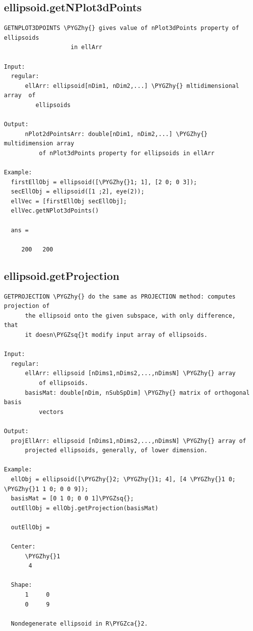 \documentclass[letterpaper,10pt,english]{sphinxmanual}
\def\PYGZca{\char`\^}
\def\PYGZhy{\char`\-}
\def\PYGZsq{\char`\'}
\begin{document}
\subsection{ellipsoid.getNPlot3dPoints}
\label{chap_functions:ellipsoid-getnplot3dpoints}
\begin{Verbatim}[commandchars=\\\{\}]
GETNPLOT3DPOINTS \PYGZhy{} gives value of nPlot3dPoints property of ellipsoids
                   in ellArr

Input:
  regular:
      ellArr: ellipsoid[nDim1, nDim2,...] \PYGZhy{} mltidimensional array  of
         ellipsoids

Output:
      nPlot2dPointsArr: double[nDim1, nDim2,...] \PYGZhy{} multidimension array
          of nPlot3dPoints property for ellipsoids in ellArr

Example:
  firstEllObj = ellipsoid([\PYGZhy{}1; 1], [2 0; 0 3]);
  secEllObj = ellipsoid([1 ;2], eye(2));
  ellVec = [firstEllObj secEllObj];
  ellVec.getNPlot3dPoints()

  ans =

     200   200
\end{Verbatim}


\subsection{ellipsoid.getProjection}
\label{chap_functions:ellipsoid-getprojection}
\begin{Verbatim}[commandchars=\\\{\}]
GETPROJECTION \PYGZhy{} do the same as PROJECTION method: computes projection of
      the ellipsoid onto the given subspace, with only difference, that
      it doesn\PYGZsq{}t modify input array of ellipsoids.

Input:
  regular:
      ellArr: ellipsoid [nDims1,nDims2,...,nDimsN] \PYGZhy{} array
          of ellipsoids.
      basisMat: double[nDim, nSubSpDim] \PYGZhy{} matrix of orthogonal basis
          vectors

Output:
  projEllArr: ellipsoid [nDims1,nDims2,...,nDimsN] \PYGZhy{} array of
      projected ellipsoids, generally, of lower dimension.

Example:
  ellObj = ellipsoid([\PYGZhy{}2; \PYGZhy{}1; 4], [4 \PYGZhy{}1 0; \PYGZhy{}1 1 0; 0 0 9]);
  basisMat = [0 1 0; 0 0 1]\PYGZsq{};
  outEllObj = ellObj.getProjection(basisMat)

  outEllObj =

  Center:
      \PYGZhy{}1
       4

  Shape:
      1     0
      0     9

  Nondegenerate ellipsoid in R\PYGZca{}2.
\end{Verbatim}
\end{document}
